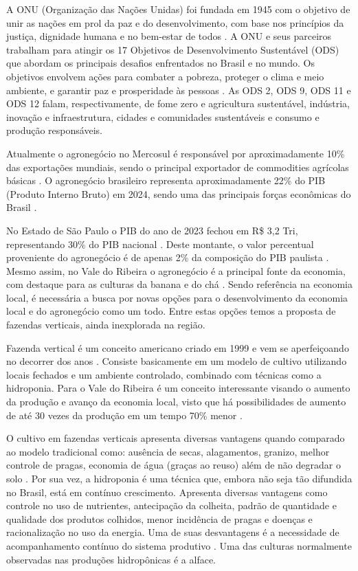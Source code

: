 A ONU (Organização das Nações Unidas) foi fundada em 1945 com o objetivo de unir as nações em prol da paz e do desenvolvimento, com base nos princípios da justiça, dignidade humana e no bem-estar de todos \cite{unric2024}. A ONU e seus parceiros trabalham para atingir os 17 Objetivos de Desenvolvimento Sustentável (ODS) que abordam os principais desafios enfrentados no Brasil e no mundo. Os objetivos envolvem ações para combater a pobreza, proteger o clima e meio ambiente, e garantir paz e prosperidade às pessoas \cite{nacoesunidas2024}. As ODS 2, ODS 9, ODS 11 e ODS 12 falam, respectivamente, de fome zero e agricultura sustentável, indústria, inovação e infraestrutura, cidades e comunidades sustentáveis e consumo e produção responsáveis.

Atualmente o agronegócio no Mercosul é responsável por aproximadamente 10\% das exportações mundiais, sendo o principal exportador de commodities agrícolas básicas \cite{AgênciaGov2024}. O agronegócio brasileiro representa aproximadamente 22\% do PIB (Produto Interno Bruto) em 2024, sendo uma das principais forças econômicas do Brasil \cite{cepea2024}.

No Estado de São Paulo o PIB do ano de 2023 fechou em R\$ 3,2 Tri, representando 30\% do PIB nacional \cite{seade2024Pib}. Deste montante, o valor percentual proveniente do agronegócio é de apenas 2\% da composição do PIB paulista \cite{seade2024Pib}. Mesmo assim, no Vale do Ribeira o agronegócio é a principal fonte da economia, com destaque para as culturas da banana e do chá \cite{govsp2024}. Sendo referência na economia local, é necessária a busca por novas opções para o desenvolvimento da economia local e do agronegócio como um todo. Entre estas opções temos a proposta de fazendas verticais, ainda inexplorada na região.

Fazenda vertical é um conceito americano criado em 1999 e vem se aperfeiçoando no decorrer dos anos \cite{chloe2021}. Consiste basicamente em um modelo de cultivo utilizando locais fechados e um ambiente controlado, combinado com técnicas como a hidroponia. Para o Vale do Ribeira é um conceito interessante visando o aumento da produção e avanço da economia local, visto que há possibilidades de aumento de até 30 vezes da produção em um tempo 70\% menor \cite{gundim2022}.

O cultivo em fazendas verticais apresenta diversas vantagens quando comparado ao modelo tradicional como: ausência de secas, alagamentos, granizo, melhor controle de pragas, economia de água (graças ao reuso) além de não degradar o solo \cite{ingram2023}. Por sua vez, a hidroponia é uma técnica que, embora não seja tão difundida no Brasil, está em contínuo crescimento. Apresenta diversas vantagens como controle no uso de nutrientes, antecipação da colheita, padrão de quantidade e qualidade dos produtos colhidos, menor incidência de pragas e doenças e racionalização no uso da energia. Uma de suas desvantagens é a necessidade de acompanhamento contínuo do sistema produtivo \cite{luz2006}. Uma das culturas normalmente observadas nas produções hidropônicas é a alface.

